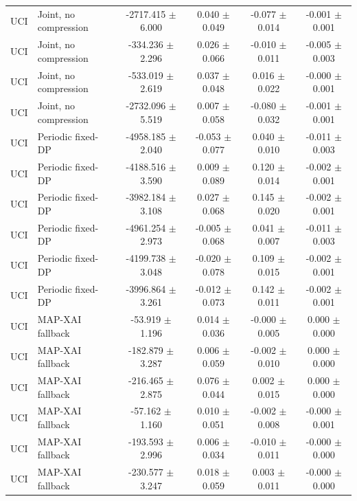 \begin{table}[t]
\begin{tabular}{llcccc}
UCI & Joint, no compression & -2717.415 $\pm$ 6.000 & 0.040 $\pm$ 0.049 & -0.077 $\pm$ 0.014 & -0.001 $\pm$ 0.001 \\
UCI & Joint, no compression & -334.236 $\pm$ 2.296 & 0.026 $\pm$ 0.066 & -0.010 $\pm$ 0.011 & -0.005 $\pm$ 0.003 \\
UCI & Joint, no compression & -533.019 $\pm$ 2.619 & 0.037 $\pm$ 0.048 & 0.016 $\pm$ 0.022 & -0.000 $\pm$ 0.001 \\
UCI & Joint, no compression & -2732.096 $\pm$ 5.519 & 0.007 $\pm$ 0.058 & -0.080 $\pm$ 0.032 & -0.001 $\pm$ 0.001 \\
UCI & Periodic fixed-DP & -4958.185 $\pm$ 2.040 & -0.053 $\pm$ 0.077 & 0.040 $\pm$ 0.010 & -0.011 $\pm$ 0.003 \\
UCI & Periodic fixed-DP & -4188.516 $\pm$ 3.590 & 0.009 $\pm$ 0.089 & 0.120 $\pm$ 0.014 & -0.002 $\pm$ 0.001 \\
UCI & Periodic fixed-DP & -3982.184 $\pm$ 3.108 & 0.027 $\pm$ 0.068 & 0.145 $\pm$ 0.020 & -0.002 $\pm$ 0.001 \\
UCI & Periodic fixed-DP & -4961.254 $\pm$ 2.973 & -0.005 $\pm$ 0.068 & 0.041 $\pm$ 0.007 & -0.011 $\pm$ 0.003 \\
UCI & Periodic fixed-DP & -4199.738 $\pm$ 3.048 & -0.020 $\pm$ 0.078 & 0.109 $\pm$ 0.015 & -0.002 $\pm$ 0.001 \\
UCI & Periodic fixed-DP & -3996.864 $\pm$ 3.261 & -0.012 $\pm$ 0.073 & 0.142 $\pm$ 0.011 & -0.002 $\pm$ 0.001 \\
UCI & MAP-XAI fallback & -53.919 $\pm$ 1.196 & 0.014 $\pm$ 0.036 & -0.000 $\pm$ 0.005 & 0.000 $\pm$ 0.000 \\
UCI & MAP-XAI fallback & -182.879 $\pm$ 3.287 & 0.006 $\pm$ 0.059 & -0.002 $\pm$ 0.010 & 0.000 $\pm$ 0.000 \\
UCI & MAP-XAI fallback & -216.465 $\pm$ 2.875 & 0.076 $\pm$ 0.044 & 0.002 $\pm$ 0.015 & 0.000 $\pm$ 0.000 \\
UCI & MAP-XAI fallback & -57.162 $\pm$ 1.160 & 0.010 $\pm$ 0.051 & -0.002 $\pm$ 0.008 & -0.000 $\pm$ 0.001 \\
UCI & MAP-XAI fallback & -193.593 $\pm$ 2.996 & 0.006 $\pm$ 0.034 & -0.010 $\pm$ 0.011 & -0.000 $\pm$ 0.000 \\
UCI & MAP-XAI fallback & -230.577 $\pm$ 3.247 & 0.018 $\pm$ 0.059 & 0.003 $\pm$ 0.011 & -0.000 $\pm$ 0.000 \\
\bottomrule
\end{tabular}
\end{table}
